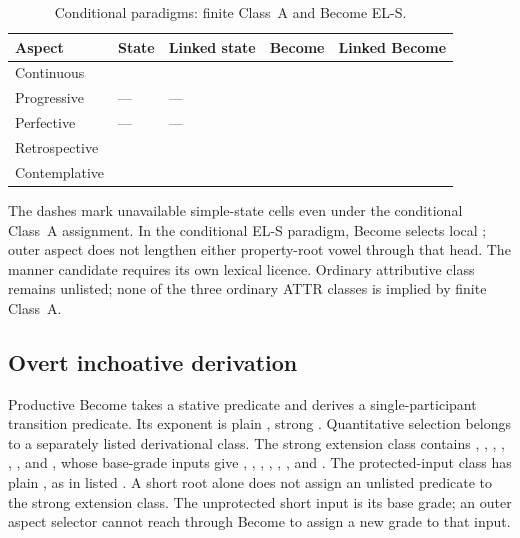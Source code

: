 \begin{table}[htbp]
\footnotesize
\caption{Conditional  paradigms: finite Class~A and Become EL-S.}
\label{tab:torban-conditional}
\begin{tabularx}{\textwidth}{l L L L L}
\toprule
Aspect & State & Linked state & Become & Linked Become \\
\midrule
Continuous &  &  &  &  \\
Progressive & --- & --- &  &  \\
Perfective & --- & --- &  &  \\
Retrospective &  &  &  &  \\
Contemplative &  &  &  &  \\
\bottomrule
\end{tabularx}
\end{table}

The dashes mark unavailable simple-state cells even under the conditional
Class~A assignment. In the conditional EL-S paradigm, Become selects local
; outer aspect does not lengthen either property-root vowel
through that head. The manner candidate  requires its own
lexical licence. Ordinary attributive class remains unlisted; none of the
three ordinary ATTR classes is implied by finite Class~A.

\subsection{Overt inchoative derivation}\label{sec:stative-inchoative}

Productive Become takes a stative predicate and derives a single-participant
transition predicate. Its exponent is plain , strong .
Quantitative selection belongs to a separately listed derivational class.
The strong extension class contains , ,
, , , ,
 and , whose base-grade
inputs give , , ,
, , , 
and . The protected-input class has
plain , as in listed . A short root alone
does not assign an unlisted predicate to the strong extension class.
The unprotected short input is its base grade; an outer aspect selector
cannot reach through Become to assign a new grade to that input.

